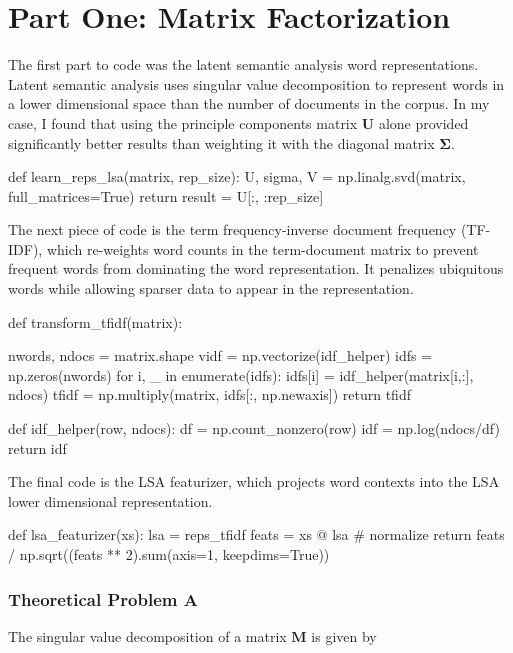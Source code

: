 \chapter*{Part One: Matrix Factorization}

The first part to code was the latent semantic analysis word representations. Latent semantic analysis uses singular value decomposition to represent words in a lower dimensional space than the number of documents in the corpus. In my case, I found that using the principle components matrix $\bm{U}$ alone provided significantly better results than weighting it with the diagonal matrix $\bm{\Sigma}$.

\begin{python}
    def learn_reps_lsa(matrix, rep_size):
    U, sigma, V = np.linalg.svd(matrix, full_matrices=True)
    return result = U[:, :rep_size]
\end{python}

The next piece of code is the term frequency-inverse document frequency (TF-IDF), which re-weights word counts in the term-document matrix to prevent frequent words from dominating the word representation. It penalizes ubiquitous words while allowing sparser data to appear in the representation.

\begin{python}
    def transform_tfidf(matrix):

    nwords, ndocs = matrix.shape
    vidf = np.vectorize(idf_helper)
    idfs = np.zeros(nwords)
    for i, _ in enumerate(idfs):
    idfs[i] = idf_helper(matrix[i,:], ndocs)
    tfidf = np.multiply(matrix, idfs[:, np.newaxis])
    return tfidf

    def idf_helper(row, ndocs):
    df = np.count_nonzero(row)
    idf = np.log(ndocs/df)
    return idf
\end{python}

The final code is the LSA featurizer, which projects word contexts into the LSA lower dimensional representation.

\begin{python}
    def lsa_featurizer(xs):
    lsa = reps_tfidf
    feats = xs @ lsa
    # normalize
    return feats / np.sqrt((feats ** 2).sum(axis=1, keepdims=True))
\end{python}

\subsection*{Theoretical Problem A}
The singular value decomposition of a matrix $\bm{M}$ is given by

